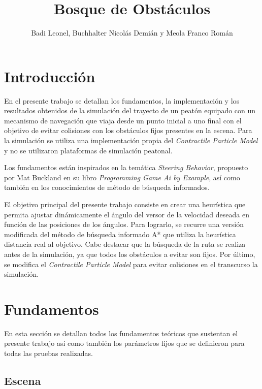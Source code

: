 \documentclass[a4paper,10pt]{article}
\title{Bosque de Obstáculos}
\author{Badi Leonel, Buchhalter Nicolás Demián y Meola Franco Román}
\begin{document}
\maketitle

\pagebreak

\tableofcontents

\newpage

\section{Introducción}

En el presente trabajo se detallan los fundamentos, la implementación y los resultados obtenidos de la simulación del trayecto de un peatón equipado con un mecanismo de navegación que viaja desde un punto inicial a uno final con el objetivo de  evitar colisiones con los obstáculos fijos presentes en la escena. Para la simulación se utiliza una implementación propia del \textit{Contractile Particle Model} y no se utilizaron plataformas de simulación peatonal.

Los fundamentos están inspirados en la temática \textit{Steering Behavior}, propuesto por Mat Buckland en su libro \textit{Programming Game Ai by Example}, así como también en los conocimientos de método de búsqueda informados.

El objetivo principal del presente trabajo consiste en crear una heurística que permita ajustar dinámicamente el ángulo del versor de la velocidad deseada en función de las posiciones de los ángulos. Para lograrlo, se recurre una versión modificada del método de búsqueda informado A* que utiliza la heurística distancia real al objetivo. Cabe destacar que la búsqueda de la ruta se realiza antes de la simulación, ya que todos los obstáculos a evitar son fijos. Por último, se modifica el \textit{Contractile Particle Model} para evitar colisiones en el transcurso la simulación.

\section{Fundamentos}

En esta sección se detallan todos los fundamentos teóricos que sustentan el presente trabajo así como también los parámetros fijos que se definieron para todas las pruebas realizadas.

\subsection{Escena}
\end{document}
